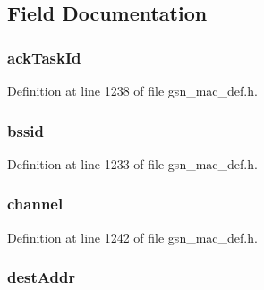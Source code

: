 \subsection{Field Documentation}
\hypertarget{a00124_a3598d9e9ce94cff999cc297ce8c41a9c}{
\subsubsection[{ackTaskId}]{ {\bf ackTaskId}}}
\label{a00124_a3598d9e9ce94cff999cc297ce8c41a9c}


Definition at line 1238 of file gsn\_\-mac\_\-def.h.

\hypertarget{a00124_a0c8072b3bb52f68906a0aacd382de7c2}{
\subsubsection[{bssid}]{ {\bf bssid}}}
\label{a00124_a0c8072b3bb52f68906a0aacd382de7c2}


Definition at line 1233 of file gsn\_\-mac\_\-def.h.

\hypertarget{a00124_a52d69a3bd7bdfdfc6f9e40f4962c575d}{
\subsubsection[{channel}]{ {\bf channel}}}
\label{a00124_a52d69a3bd7bdfdfc6f9e40f4962c575d}


Definition at line 1242 of file gsn\_\-mac\_\-def.h.

\hypertarget{a00124_a3cae30f7120214990004e210534137a4}{
\subsubsection[{destAddr}]{ {\bf destAddr}}}
\label{a00124_a3cae30f7120214990004e210534137a4}


